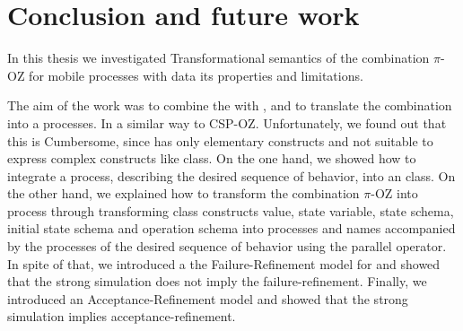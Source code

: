 \chapter{Conclusion and future work}
\label{sec_conclusion}
In this thesis we investigated Transformational semantics of the combination $\pi$-OZ for mobile processes with data its properties and limitations.

The aim of the work was to combine the \oz{} with \picalc{}, and to translate the combination into a \picalc{} processes. In a similar way to CSP-OZ. Unfortunately, we found out that this is Cumbersome, since \picalc{} has only elementary constructs and not suitable to express complex constructs like \oz{} class. On the one hand, we showed how to integrate a \picalc{} process, describing the desired sequence of behavior, into an \oz{} class. On the other hand, we explained how to transform the combination $\pi$-OZ into \picalc{} process through transforming \oz{} class constructs value, state variable, state schema, initial state schema and operation schema into \picalc{} processes and names accompanied by the processes of the desired sequence of behavior using the parallel operator. In spite of that, we introduced a the Failure-Refinement model for \picalc{} and showed that the strong simulation does not imply the failure-refinement. Finally, we introduced an Acceptance-Refinement model and showed that the strong simulation implies acceptance-refinement. 


